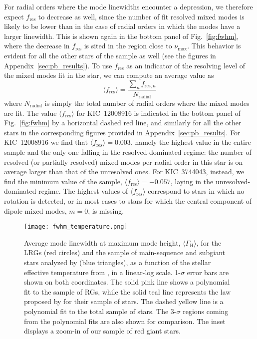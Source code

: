\documentclass[structabstract]{aa}
\newcommand{\numax}{\nu_\mathrm{max}}
\newcommand{\kic}{KIC~12008916}
\begin{document}
For radial orders where the mode linewidths encounter a depression, we therefore expect $f_\mathrm{res}$ to decrease as well, since the number of fit resolved mixed modes is likely to be lower than in the case of radial orders in which the modes have a larger linewidth. This is shown again in the bottom panel of Fig.~\ref{fig:fwhm}, where the decrease in $f_\mathrm{res}$ is sited in the region close to $\numax$. This behavior is evident for all the other stars of the sample as well (see the figures in Appendix~\ref{sec:pb_results}).
To use $f_\mathrm{res}$ as an indicator of the resolving level of the mixed modes fit in the star, we can compute an average value as
\begin{equation}
\langle f_{\mathrm{res}} \rangle = \frac{\sum_n f_{\mathrm{res},n}}{N_\mathrm{radial}}
\label{eq:average_fraction}
\end{equation}
where $N_\mathrm{radial}$ is simply the total number of radial orders where the mixed modes are fit. The value $\langle f_{\mathrm{res}} \rangle$ for \kic\,\,is indicated in the bottom panel of Fig.~\ref{fig:fwhm} by a horizontal dashed red line, and similarly for all the other stars in the corresponding figures provided in Appendix~\ref{sec:pb_results}. For \kic\,\,we find that $\langle f_{\mathrm{res}} \rangle = 0.003$, namely the highest value in the entire sample and the only one falling in the resolved-dominated regime: the number of resolved (or partially resolved) mixed modes per radial order in this star is on average larger than that of the unresolved ones. For KIC~3744043, instead, we find the minimum value of the sample, $\langle f_{\mathrm{res}} \rangle = -0.057$, laying in the unresolved-dominated regime. The highest values of $\langle f_{\mathrm{res}} \rangle$ correspond to stars in which no rotation is detected, or in most cases to stars for which the central component of dipole mixed modes, $m=0$, is missing.

\begin{figure}
   \centering
   \texttt{[image: fwhm\_temperature.png]}
      \caption{Average mode linewidth at maximum mode height, $\langle \Gamma_\mathrm{H} \rangle$, for the LRGs (red circles) and the sample of main-sequence and subgiant stars analyzed by \cite{App12fwhm} (blue triangles), as a function of the stellar effective temperature from \cite{Pin12}, in a linear-log scale. 1-$\sigma$ error bars are shown on both coordinates. The solid pink line shows a polynomial fit to the sample of RGs, while the solid teal line represents the law proposed by \cite{App12fwhm} for their sample of stars. The dashed yellow line is a polynomial fit to the total sample of stars. The 3-$\sigma$ regions coming from the polynomial fits are also shown for comparison. The inset displays a zoom-in of our sample of red giant stars.}
    \label{fig:fwhm_temp}
\end{figure}
\end{document}
